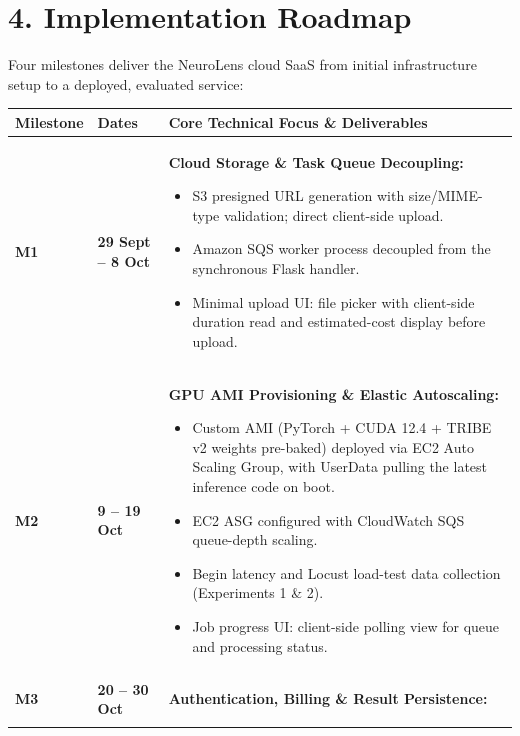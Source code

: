 \documentclass[10pt,a4paper]{article}
\begin{document}
\section*{\textsf{4. Implementation Roadmap}}

Four milestones deliver the NeuroLens cloud SaaS from initial infrastructure setup to a deployed, evaluated service:

\vspace{1mm}
\noindent
\begin{tabularx}{\textwidth}{|l|l|X|}
\hline
\rowcolor{black!5}
\textbf{Milestone} & \textbf{Dates} & \textbf{Core Technical Focus \& Deliverables} \\
\hline
\textbf{M1} & \textbf{29 Sept -- 8 Oct} & \textbf{Cloud Storage \& Task Queue Decoupling:}
\begin{itemize}[leftmargin=*, itemsep=3pt, topsep=3pt, parsep=1pt]
    \item S3 presigned URL generation with size/MIME-type validation; direct client-side upload.
    \item Amazon SQS worker process decoupled from the synchronous Flask handler.
    \item Minimal upload UI: file picker with client-side duration read and estimated-cost display before upload.
\end{itemize} \\
\hline
\textbf{M2} & \textbf{9 -- 19 Oct} & \textbf{GPU AMI Provisioning \& Elastic Autoscaling:}
\begin{itemize}[leftmargin=*, itemsep=3pt, topsep=3pt, parsep=1pt]
    \item Custom AMI (PyTorch + CUDA 12.4 + TRIBE v2 weights pre-baked) deployed via EC2 Auto Scaling Group, with UserData pulling the latest inference code on boot.
    \item EC2 ASG configured with CloudWatch SQS queue-depth scaling.
    \item Begin latency and Locust load-test data collection (Experiments 1 \& 2).
    \item Job progress UI: client-side polling view for queue and processing status.
\end{itemize} \\
\hline
\textbf{M3} & \textbf{20 -- 30 Oct} & \textbf{Authentication, Billing \& Result Persistence:}
\begin{itemize}[leftmargin=*, itemsep=3pt, topsep=3pt, parsep=1pt]

\end{itemize}
\end{tabularx}
\end{document}

